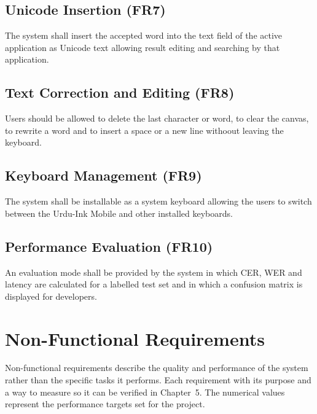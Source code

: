 \documentclass[12pt,a4paper]{report}
\begin{document}
\subsection{Unicode Insertion (FR7)}
The system shall insert the accepted word into the text field of the active application as Unicode text allowing result editing and searching by that application.

\subsection{Text Correction and Editing (FR8)}
Users should be allowed to delete the last character or word, to clear the canvas, to rewrite a word and to insert a space or a new line withoout leaving the keyboard.

\subsection{Keyboard Management (FR9)}
The system shall be installable as a system keyboard allowing the users to switch between the Urdu-Ink Mobile and other installed keyboards. 

\subsection{Performance Evaluation (FR10)}
An evaluation mode shall be provided by the system in which CER, WER and latency are calculated for a labelled test set and in which a confusion matrix is displayed for developers.

\section{Non-Functional Requirements}
Non-functional requirements describe the quality and performance of the system rather than the specific tasks it performs. Each requirement with its purpose and a way to measure so it can be verified in Chapter~5. The numerical values represent the performance targets set for the project. 
\end{document}
